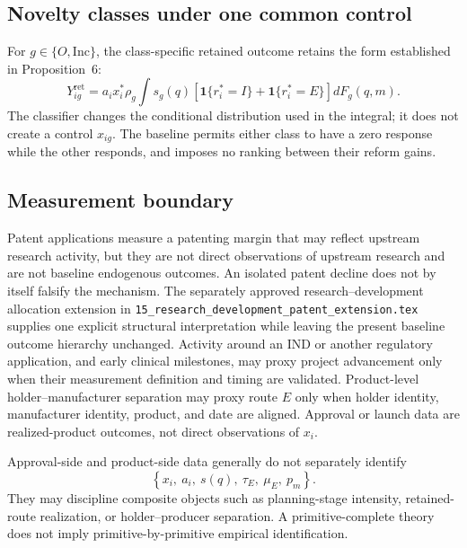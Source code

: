 \subsection{Novelty classes under one common control}
\label{subsec:p09-types}

For \(g\in\{O,\mathrm{Inc}\}\), the class-specific retained outcome retains
the form established in Proposition~6:
\begin{equation}
  Y_{ig}^{\mathrm{ret}}
  =
  a_ix_i^*\rho_g
  \int
  s_g(q)
  \left[
    \mathbf 1\{r_i^*=I\}
    +
    \mathbf 1\{r_i^*=E\}
  \right]
  dF_g(q,m).
  \label{eq:p09-type-mixture}
\end{equation}
The classifier changes the conditional distribution used in the integral; it
does not create a control \(x_{ig}\). The baseline permits either class to
have a zero response while the other responds, and imposes no ranking between
their reform gains.

\subsection{Measurement boundary}
\label{subsec:p09-measurement}

Patent applications measure a patenting margin that may reflect upstream
research activity, but they are not direct observations of upstream research
and are not baseline endogenous outcomes. An isolated patent decline does not
by itself falsify the mechanism. The separately approved
research--development allocation extension in
\texttt{15\_research\_development\_patent\_extension.tex} supplies one
explicit structural interpretation while leaving the present baseline
outcome hierarchy unchanged.
Activity around an IND or another regulatory application, and early clinical
milestones, may proxy project advancement only when their measurement definition and
timing are validated.
Product-level holder--manufacturer separation may proxy route \(E\) only when
holder identity, manufacturer identity, product, and date are aligned.
Approval or launch data are realized-product outcomes, not direct observations
of \(x_i\).

Approval-side and product-side data generally do not separately identify
\begin{equation}
  \left\{
    x_i,\ a_i,\ s(q),\ \tau_E,\ \mu_E,\ p_m
  \right\}.
  \label{eq:p09-identification-boundary}
\end{equation}
They may discipline composite objects such as planning-stage intensity,
retained-route realization, or holder--producer separation. A
primitive-complete theory does not imply primitive-by-primitive empirical
identification.


